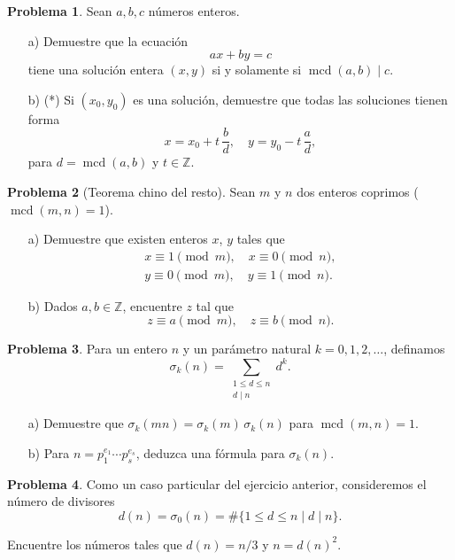 \documentclass{article}
\newcommand{\ZZ}{\mathbb{Z}}
\DeclareMathOperator{\mcd}{mcd}
\theoremstyle{definition}
\newtheorem{problema}{Problema}
\begin{document}
\begin{problema}
  Sean $a,b,c$ números enteros.

  \begin{enumerate}
  \item[a)] Demuestre que la ecuación
    $$ax + by = c$$
    tiene una solución entera $(x,y)$ si y solamente si $\mcd (a,b) \mid c$.

  \item[b)] (*) Si $(x_0,y_0)$ es una solución, demuestre que todas las
    soluciones tienen forma
    $$x = x_0 + t\,\frac{b}{d}, \quad y = y_0 - t\,\frac{a}{d},$$
    para $d = \mcd (a,b)$ y $t \in \ZZ$.
  \end{enumerate}
\end{problema}

\begin{problema}[Teorema chino del resto]
  Sean $m$ y $n$ dos enteros coprimos ($\mcd (m,n) = 1$).

  \begin{itemize}
  \item[a)] Demuestre que existen enteros $x$, $y$ tales que
    \begin{gather*}
      x \equiv 1 \pmod{m}, \quad x \equiv 0 \pmod{n}, \\
      y \equiv 0 \pmod{m}, \quad y \equiv 1 \pmod{n}.
    \end{gather*}

  \item[b)] Dados $a, b \in \ZZ$, encuentre $z$ tal que
    $$z \equiv a \pmod{m}, \quad z \equiv b \pmod{n}.$$
  \end{itemize}
\end{problema}

\begin{problema}
  Para un entero $n$ y un parámetro natural $k = 0,1,2,\ldots$, definamos
  $$\sigma_k (n) = \sum_{\substack{1 \le d \le n \\ d \mid n}} d^k.$$

  \begin{enumerate}
  \item[a)] Demuestre que $\sigma_k (mn) = \sigma_k (m) \, \sigma_k (n)$ para
    $\mcd (m,n) = 1$.

  \item[b)] Para $n = p_1^{e_1} \cdots p_s^{e_s}$, deduzca una fórmula para
    $\sigma_k (n)$.
  \end{enumerate}
\end{problema}

\begin{problema}
  Como un caso particular del ejercicio anterior, consideremos el número de
  divisores
  $$d (n) = \sigma_0 (n) = \# \{ 1 \le d \le n \mid d \mid n \}.$$

  Encuentre los números tales que $d (n) = n/3$ y $n = d(n)^2$.
\end{problema}
\end{document}
